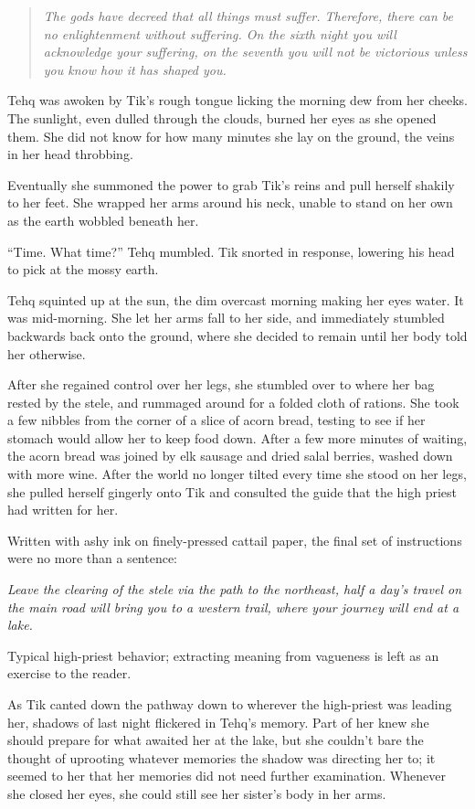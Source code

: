 \begin{quote}
\emph{The gods have decreed that all things must suffer. Therefore, there can be no enlightenment without suffering. On the sixth night you will acknowledge your suffering, on the seventh you will not be victorious unless you know how it has shaped you.}
\end{quote}

Tehq was awoken by Tik's rough tongue licking the morning dew from her cheeks. The sunlight, even dulled through the clouds, burned her eyes as she opened them. She did not know for how many minutes she lay on the ground, the veins in her head throbbing.

Eventually she summoned the power to grab Tik's reins and pull herself shakily to her feet. She wrapped her arms around his neck, unable to stand on her own as the earth wobbled beneath her.

``Time. What time?'' Tehq mumbled. Tik snorted in response, lowering his head to pick at the mossy earth.

Tehq squinted up at the sun, the dim overcast morning making her eyes water. It was mid-morning. She let her arms fall to her side, and immediately stumbled backwards back onto the ground, where she decided to remain until her body told her otherwise.

After she regained control over her legs, she stumbled over to where her bag rested by the stele, and rummaged around for a folded cloth of rations. She took a few nibbles from the corner of a slice of acorn bread, testing to see if her stomach would allow her to keep food down. After a few more minutes of waiting, the acorn bread was joined by elk sausage and dried salal berries, washed down with more wine. After the world no longer tilted every time she stood on her legs, she pulled herself gingerly onto Tik and consulted the guide that the high priest had written for her.

Written with ashy ink on finely-pressed cattail paper, the final set of instructions were no more than a sentence:

\emph{Leave the clearing of the stele via the path to the northeast, half a day's travel on the main road will bring you to a western trail, where your journey will end at a lake.}

Typical high-priest behavior; extracting meaning from vagueness is left as an exercise to the reader.

As Tik canted down the pathway down to wherever the high-priest was leading her, shadows of last night flickered in Tehq's memory. Part of her knew she should prepare for what awaited her at the lake, but she couldn't bare the thought of uprooting whatever memories the shadow was directing her to; it seemed to her that her memories did not need further examination. Whenever she closed her eyes, she could still see her sister's body in her arms.

